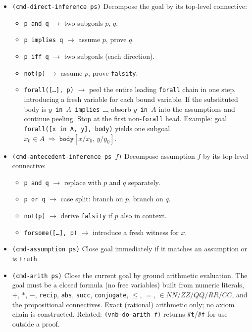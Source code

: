 \begin{itemize}

\item \texttt{(cmd-direct-inference ps)}
  Decompose the goal by its top-level connective:
  \begin{itemize}
  \item \texttt{p and q} $\to$ two subgoals $p$, $q$.
  \item \texttt{p implies q} $\to$ assume $p$, prove $q$.
  \item \texttt{p iff q} $\to$ two subgoals (each direction).
  \item \texttt{not(p)} $\to$ assume $p$, prove \texttt{falsity}.
  \item \texttt{forall([\ldots], p)} $\to$ peel the entire leading
    \texttt{forall} chain in one step, introducing a fresh variable for
    each bound variable.  If the substituted body is
    \texttt{$y$ in $A$ implies \ldots}, absorb \texttt{$y$ in $A$} into
    the assumptions and continue peeling.  Stop at the first
    non-\texttt{forall} head.
    Example: goal \texttt{forall([x in A, y], body)} yields one subgoal
    $x_0 \in A \;\Longrightarrow\; \texttt{body}[x/x_0,\,y/y_0]$.
  \end{itemize}

\item \texttt{(cmd-antecedent-inference ps $f$)}
  Decompose assumption $f$ by its top-level connective:
  \begin{itemize}
  \item \texttt{p and q} $\to$ replace with $p$ and $q$ separately.
  \item \texttt{p or q} $\to$ case split: branch on $p$, branch on $q$.
  \item \texttt{not(p)} $\to$ derive \texttt{falsity} if $p$ also in context.
  \item \texttt{forsome([\ldots], p)} $\to$ introduce a fresh witness for $x$.
  \end{itemize}

\item \texttt{(cmd-assumption ps)}
  Close goal immediately if it matches an assumption or is \texttt{truth}.

\item \texttt{(cmd-arith ps)}
  Close the current goal by ground arithmetic evaluation.  The goal must
  be a closed formula (no free variables) built from numeric literals,
  $+$, $*$, $-$, \texttt{recip}, \texttt{abs}, \texttt{succ},
  \texttt{conjugate}, $\leq$, $=$,
  $\in \mathit{NN}/\mathit{ZZ}/\mathit{QQ}/\mathit{RR}/\mathit{CC}$,
  and the propositional connectives.  Exact (rational) arithmetic only;
  no axiom chain is constructed.
  Related: \texttt{(vnb-do-arith \textit{f})} returns \texttt{\#t}/\texttt{\#f}
  for use outside a proof.


\end{itemize}
